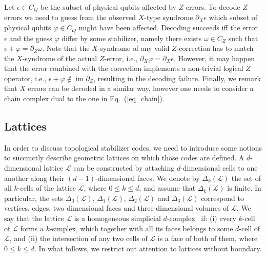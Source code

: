 \documentclass[onecolumn,letterpaper,11pt,accepted=2022-12-19]{quantumarticle}
\newcommand{\face}[2]{{\Delta_{#1}(#2)}}
\DeclareMathOperator{\im}{im}
\theoremstyle{definition}
\theoremstyle{lemma}
\theoremstyle{theorem}
\theoremstyle{corollary}
\begin{document}
Let $\epsilon\in C_Q$ be the subset of physical qubits affected by $Z$ errors.
To decode $Z$ errors we need to guess from the observed $X$-type syndrome $\partial_X\epsilon$ which subset of physical qubits $\varphi\in C_Q$ might have been affected.
Decoding succeeds iff the error $\epsilon$ and the guess $\varphi$ differ by some stabilizer, namely there exists $\omega\in C_Z$ such that $\epsilon + \varphi = \partial_Z \omega$.
Note that the $X$-syndrome of any valid $Z$-correction has to match the $X$-syndrome of the actual $Z$-error, i.e., $\partial_X \varphi = \partial_X \epsilon$.
However, it may happen that the error combined with the correction implements a non-trivial logical $Z$ operator, i.e., $\epsilon+\varphi \not\in\im \partial_Z$, resulting in the decoding failure.
Finally, we remark that $X$ errors can be decoded in a similar way, however one needs to consider a chain complex dual to the one in Eq.~(\ref{eq_chain}).


\subsection{Lattices}


In order to discuss topological stabilizer codes, we need to introduce some notions to succinctly describe geometric lattices on which those codes are defined.
A $d$-dimensional lattice $\mathcal{L}$ can be constructed by attaching $d$-dimensional cells to one another along their $(d-1)$-dimensional faces.
We denote by $\face k {\mathcal{L}}$ the set of all $k$-cells of the lattice $\mathcal{L}$, where $0\leq k\leq d$, and assume that $\face k {\mathcal{L}}$ is finite.
In particular, the sets $\face 0 {\mathcal{L}}$, $\face 1 {\mathcal{L}}$, $\face 2 {\mathcal{L}}$ and $\face 3 {\mathcal{L}}$ correspond to vertices, edges, two-dimensional faces and three-dimensional volumes of $\mathcal{L}$.
We say that the lattice $\mathcal{L}$ is a homogeneous simplicial $d$-complex~\cite{Hatcher2002} if: (i) every $k$-cell of $\mathcal{L}$ forms a $k$-simplex, which together with all its faces belongs to some $d$-cell of $\mathcal{L}$, and (ii) the intersection of any two cells of $\mathcal{L}$ is a face of both of them, where $0\leq k \leq d$.
In what follows, we restrict out attention to lattices without boundary.
\end{document}

